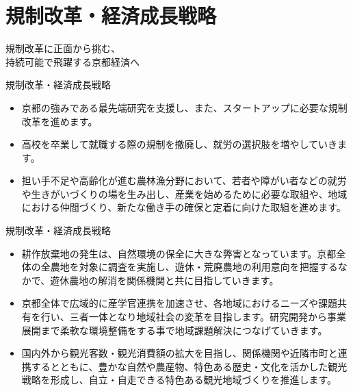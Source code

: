 \documentclass[dvipdfmx]{beamer}
\begin{document}
\section{規制改革・経済成長戦略}
    \begin{frame}{}{}
        \sectionpage
        \begin{center}
            \begin{large}
                \alert{規制改革に正面から挑む、}\\\alert{持続可能で飛躍する京都経済へ}
            \end{large}
        \end{center}
    \end{frame}

    \begin{frame}{規制改革・経済成長戦略}{}
        \begin{small}
            \begin{itemize}
                \setlength{\itemsep}{2mm}
                \item 京都の強みである最先端研究を支援し、また、スタートアップに必要な規制改革を進めます。
                \item 高校を卒業して就職する際の規制を撤廃し、就労の選択肢を増やしていきます。
                \item 担い手不足や高齢化が進む農林漁分野において、若者や障がい者などの就労や生きがいづくりの場を生み出し、産業を始めるために必要な取組や、地域における仲間づくり、新たな働き手の確保と定着に向けた取組を進めます。
            \end{itemize}
        \end{small}
    \end{frame}

    \begin{frame}{規制改革・経済成長戦略}{}
        \begin{small}
            \begin{itemize}
                \setlength{\itemsep}{2mm}
                \item 耕作放棄地の発生は、自然環境の保全に大きな弊害となっています。京都全体の全農地を対象に調査を実施し、遊休・荒廃農地の利用意向を把握するなかで、遊休農地の解消を関係機関と共に目指していきます。
                \item 京都全体で広域的に産学官連携を加速させ、各地域におけるニーズや課題共有を行い、三者一体となり地域社会の変革を目指します。研究開発から事業展開まで柔軟な環境整備をする事で地域課題解決につなげていきます。
                \item 国内外から観光客数・観光消費額の拡大を目指し、関係機関や近隣市町と連携するとともに、豊かな自然や農産物、特色ある歴史・文化を活かした観光戦略を形成し、自立・自走できる特色ある観光地域づくりを推進します。
            \end{itemize}
        \end{small}
    \end{frame}
\end{document}
